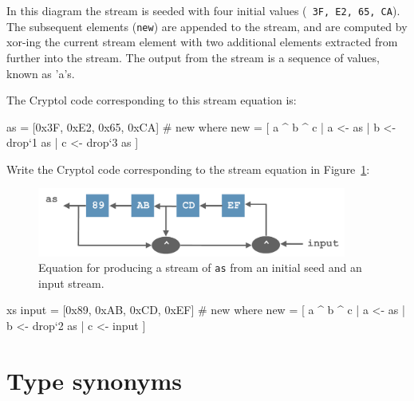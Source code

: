 In this diagram the stream is seeded with four initial values ({\tt
  3F, E2, 65, CA}). The subsequent elements ({\tt new}) are appended
to the stream, and are computed by xor-ing the current stream element
with two additional elements extracted from further into the stream.
The output from the stream is a sequence of values, known as 'a's.

The Cryptol code corresponding to this stream equation is:
\begin{code}
  as  = [0x3F, 0xE2, 0x65, 0xCA] # new
    where
      new = [ a ^ b ^ c | a <- as
                        | b <- drop`{1} as
                        | c <- drop`{3} as ]
\end{code}

{}

\begin{Exercise}\label{ex:streamEq}
  Write the Cryptol code corresponding to the stream equation in
  Figure~\ref{fig:streamExercise}:
\end{Exercise}
\begin{figure}[htbp]
\centering
\includegraphics[width=4in]{crashCourse/streamExercise}
\caption{Equation for producing a stream of {\tt as} from an initial
  seed and an input stream.}
\label{fig:streamExercise}
\end{figure}


\begin{Answer}
\begin{code}
  xs input = [0x89, 0xAB, 0xCD, 0xEF] # new
     where new = [ a ^ b ^ c | a <- as
                             | b <- drop`{2} as
                             | c <- input ]
\end{code}
\end{Answer}

\section{Type synonyms}
\label{sec:tsyn}
\indTypSynonym


